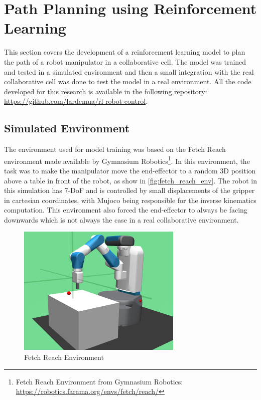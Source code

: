 \section{Path Planning using Reinforcement Learning}

This section covers the development of a reinforcement learning model to plan the path of a robot manipulator in a collaborative cell. The model was trained and tested in a simulated environment and then a small integration with the real collaborative cell was done to test the model in a real environment. All the code developed for this research is available in the following repository: \url{https://github.com/lardemua/rl-robot-control}.

\subsection{Simulated Environment}

The environment used for model training was based on the Fetch Reach environment made available by Gymnasium Robotics\footnote{Fetch Reach Environment from Gymnasium Robotics: \url{https://robotics.farama.org/envs/fetch/reach/}}. In this environment, the task was to make the manipulator move the end-effector to a random 3D position above a table in front of the robot, as show in \autoref{fig:fetch_reach_env}. The robot in this simulation has 7-DoF and is controlled by small displacements of the gripper in cartesian coordinates, with Mujoco being responsible for the inverse kinematics computation. This environment also forced the end-effector to always be facing downwards which is not always the case in a real collaborative environment.

\begin{figure}[H]%
    \centerline{\includegraphics[width=0.7\textwidth]{figs/fetch_reach.png}}
    \caption[Fetch Reach Environment]{Fetch Reach Environment}
    \label{fig:fetch_reach_env}
\end{figure}

